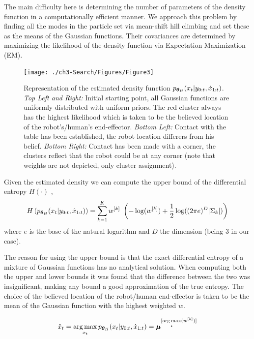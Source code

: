The main difficulty here is determining the number of parameters of the density function in a computationally efficient manner.
We approach this problem by finding all the modes in the particle set via mean-shift hill climbing and set these as the 
means of the Gaussian functions. Their covariances are determined by maximizing the likelihood of the density function 
via Expectation-Maximization (EM). 
%
%

\begin{figure}
 \centering
   \texttt{[image: ./ch3-Search/Figures/Figure3]}
  \caption{Representation of the estimated density function $p_{\boldsymbol{\theta}_H}(x_t|y_{0:t},\dot{x}_{1:t})$. \textit{Top Left and Right:} Initial starting point, 
  all Gaussian functions are uniformly distributed with uniform priors. The red cluster always has the highest likelihood which is taken
  to be the believed location of the robot's/human's end-effector. \textit{Bottom Left:} Contact with the table has been established, the robot location differers
  from his belief. \textit{Bottom Right:} Contact has been made with a corner, the clusters reflect that the robot could be at any corner (note that weights are not 
  depicted, only cluster assignment).}
  \label{fig:clustering}
\end{figure}

Given the estimated density we can compute the upper bound of the differential entropy $H(\cdot)$ \citep{DiffEntropyHuber2008},
\begin{equation}
  H\left(  p_{\boldsymbol{\theta}_H}(x_t|y_{0:t},\dot{x}_{1:t}) \right) = \sum\limits_{k=1}^{K} w^{[k]}\ \left( -\log(w^{[k]}) + \frac{1}{2} \log((2\pi e)^{D} |\Sigma_{k}|) \right)
\end{equation}
where $e$ is the base of the natural logarithm and $D$ the dimension (being 3 in our case).

The reason for using the upper bound is that the exact differential entropy of a mixture of Gaussian functions has no 
analytical solution. When computing both the
upper and lower bounds it was found that the difference between the two was insignificant, making any bound a good approximation 
of the true entropy. The choice of the believed location of the robot/human end-effector is taken to be the mean of the 
Gaussian function with the highest weighted $w$.

\begin{equation}
 \hat{x}_t = \operatorname*{arg\,max}_{x_t} p_{\boldsymbol{\theta}_H}(x_{t}|y_{0:t},\dot{x}_{1:t}) = \boldsymbol{\mu}^{[\operatorname*{arg\,max}\limits_{k}(w^{[k]})]}
\end{equation}

